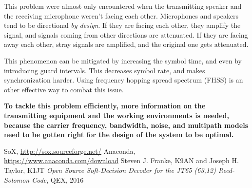 \documentclass[a4paper]{article}
\begin{document}
This problem were almost only encountered when the transmitting speaker
and the receiving microphone weren't facing each other. Microphones and
speakers tend to be directional \emph{by design}. If they are facing
each other, they amplify the signal, and signals coming from other
directions are attenuated. If they are facing away each other, stray
signals are amplified, and the original one gets attenuated.

This phenomenon can be mitigated by increasing the symbol time, and
even by introducing guard intervals. This decreases symbol rate, and
makes synchronization harder. Using frequency hopping spread spectrum
(FHSS) is an other effective way to combat this issue.

\textbf{To tackle this problem efficiently, more information on the
transmitting equipment and the working environments is needed, because
the carrier frequency, bandwidth, noise, and multipath models need to be
gotten right for the design of the system to be optimal.}

\begin{thebibliography}{9}
  SoX, \url{http://sox.sourceforge.net/}
  Anaconda, \url{https://www.anaconda.com/download}
  Steven J. Franke, K9AN and Joseph H. Taylor, K1JT
  \emph{Open Source Soft-Decision Decoder for the JT65 (63,12) Reed-Solomon
  Code}, QEX, 2016
\end{thebibliography}
\end{document}
